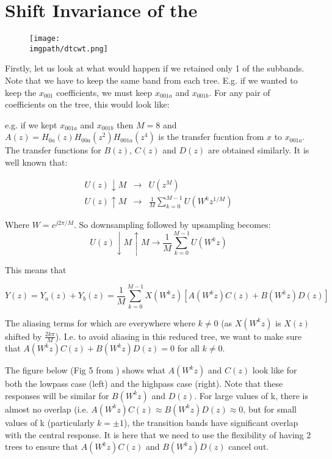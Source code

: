 \section{Shift Invariance of the \DTCWT}
\begin{figure}
  \texttt{[image: \\imgpath/dtcwt.png]}
\end{figure}

\begin{figure}
  \centering
  
  \label{fig:dtcwt_two_tree}
\end{figure}

Firstly, let us look at what would happen if we retained only 1 of the subbands.
Note that we have to keep the same band from each tree. E.g. if we wanted to
keep the $x_{001}$ coefficients, we must keep $x_{001a}$ and $x_{001b}$. For any
pair of coefficients on the tree, this would look like:

e.g. if we kept $x_{001a}$ and $x_{001b}$ then $M=8$ and $A(z) =
H_{0a}(z)H_{00a}(z^2)H_{001a}(z^4)$ is the transfer fucntion from $x$ to
$x_{001a}$. The transfer functions for $B(z)$, $C(z)$ and $D(z)$ are obtained
similarly. It is well known that:

\begin{eqnarray}
  U(z) \downarrow M &\rightarrow&  U(z^M) \\
  U(z) \uparrow M &\rightarrow & \frac{1}{M}\sum_{k=0}^{M-1}U(W^kz^{1/M})
\end{eqnarray}

Where $W=e^{j2\pi/M}$. So downsampling followed by upsampling becomes:
$$U(z) \downarrow M \uparrow M \rightarrow \frac{1}{M}\sum_{k=0}^{M-1}U(W^kz)$$

This means that

  $$Y(z) = Y_{a}(z) + Y_{b}(z) = \frac{1}{M} \sum_{k=0}^{M-1} X(W^k z) [A(W^kz)C(z) + B(W^kz)D(z)]$$

The aliasing terms for which are everywhere where $k \neq 0$ (as $X(W^kz)$ is
$X(z)$ shifted by $\frac{2k\pi}{M}$). I.e. to avoid aliasing in this reduced
tree, we want to make sure that $A(W^kz)C(z) + B(W^kz)D(z) = 0$ for all $k \neq
0$.

The figure below (Fig 5 from \cite{kingsbury_complex_2001}) shows what $A(W^kz)$
and $C(z)$ look like for both the lowpass case (left) and the highpass case
(right). Note that these responses will be similar for $B(W^kz)$ and $D(z)$. For
large values of k, there is almost no overlap (i.e. 
$A(W^kz)C(z) \approx B(W^kz)D(z) \approx 0$, 
but for small values of k (particularly $k = \pm 1$),
the transition bands have significant overlap with the central response. It is
here that we need to use the flexibility of having 2 trees to ensure that
$A(W^kz)C(z)$ and $B(W^kz)D(z)$ cancel out.

